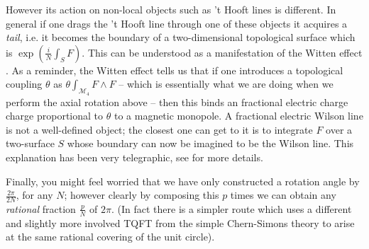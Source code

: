 \documentclass[aps,preprint,nofootinbib,preprintnumbers,eqsecnum,superscriptaddress]{revtex4}
\def\le{\left}
\def\ri{\right}
\def\th{{\theta}}
\newcommand\sM{{\ensuremath{{\mathcal M}}}}
\def\th{{\theta}}
\numberwithin{equation}{section}
\begin{document}
However its action on non-local objects such as 't Hooft lines is different. In general if one drags the 't Hooft line through one of these objects it acquires a {\it tail}, i.e. it becomes the boundary of a two-dimensional topological surface which is $\exp\le(\frac{i}{N}\int_{S} F\ri)$. This can be understood as a manifestation of the Witten effect \cite{Witten:1979ey}. As a reminder, the Witten effect tells us that if one introduces a topological coupling $\th$ as $\th \int_{\sM_4} F \wedge F$ -- which is essentially what we are doing when we perform the axial rotation above -- then this binds an fractional electric charge charge proportional to $\th$ to a magnetic monopole. A fractional electric Wilson line is not a well-defined object; the closest one can get to it is to integrate $F$ over a two-surface $S$ whose boundary can now be imagined to be the Wilson line. This explanation has been very telegraphic, see \cite{Choi:2022jqy} for more details. 

Finally, you might feel worried that we have only constructed a rotation angle by $\frac{2\pi}{2N}$, for any $N$; however clearly by composing this $p$ times we can obtain any {\it rational} fraction $\frac{p}{N}$ of $2\pi$. (In fact there is a simpler route which uses a different and slightly more involved TQFT from the simple Chern-Simons theory to arise at the same rational covering of the unit circle). 
\end{document}

